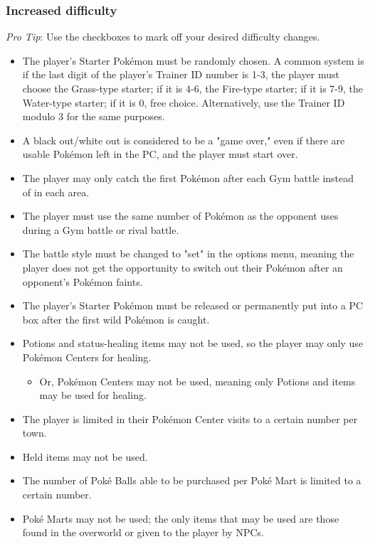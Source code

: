 \documentclass{article}
\begin{document}
	\subsubsection{Increased difficulty}
			\textit{Pro Tip}: Use the checkboxes to mark off your desired difficulty changes.
			\begin{itemize}
				\item 
					The player's Starter Pokémon must be randomly chosen. A common system is if the last digit of the player's Trainer ID number is 1-3, the player must choose the Grass-type starter; if it is 4-6, the Fire-type starter; if it is 7-9, the Water-type starter; if it is 0, free choice. Alternatively, use the Trainer ID modulo 3 for the same purposes.
				\item
					A black out/white out is considered to be a "game over," even if there are usable Pokémon left in the PC, and the player must start over.
				\item
					The player may only catch the first Pokémon after each Gym battle instead of in each area.
				\item
					The player must use the same number of Pokémon as the opponent uses during a Gym battle or rival battle.
				\item
					The battle style must be changed to "set" in the options menu, meaning the player does not get the opportunity to switch out their Pokémon after an opponent's Pokémon faints.
				\item
					The player's Starter Pokémon must be released or permanently put into a PC box after the first wild Pokémon is caught.
				\item
					Potions and status-healing items may not be used, so the player may only use Pokémon Centers for healing.
					\begin{itemize}
						\item[] Or, Pokémon Centers may not be used, meaning only Potions and items may be used for healing.
					\end{itemize}
				\item
					The player is limited in their Pokémon Center visits to a certain number per town.
				\item
					Held items may not be used.
				\item
					The number of Poké Balls able to be purchased per Poké Mart is limited to a certain number.
				\item
					Poké Marts may not be used; the only items that may be used are those found in the overworld or given to the player by NPCs.

\end{itemize}
\end{document}
